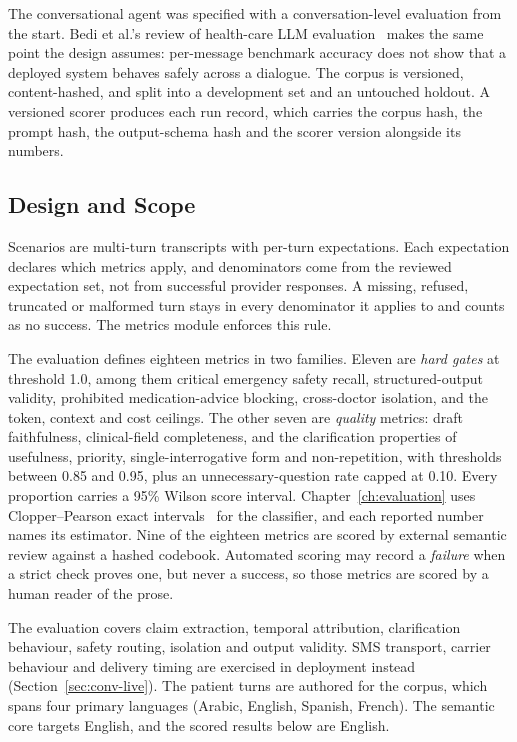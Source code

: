 The conversational agent was specified with a conversation-level evaluation from
the start. Bedi et al.'s review of health-care LLM evaluation~\cite{bedi2025testing}
makes the same point the design assumes: per-message benchmark accuracy does not
show that a deployed system behaves safely across a dialogue. The corpus is
versioned, content-hashed, and split into a development set and an untouched
holdout. A versioned scorer produces each run record, which carries the corpus
hash, the prompt hash, the output-schema hash and the scorer version alongside
its numbers.

\subsection{Design and Scope}

Scenarios are multi-turn transcripts with per-turn expectations. Each
expectation declares which metrics apply, and denominators come from the
reviewed expectation set, not from successful provider responses. A missing,
refused, truncated or malformed turn stays in every denominator it applies to
and counts as no success. The metrics module enforces this rule.

The evaluation defines eighteen metrics in two families. Eleven are \emph{hard
gates} at threshold 1.0, among them critical emergency safety recall,
structured-output validity, prohibited medication-advice blocking, cross-doctor
isolation, and the token, context and cost ceilings. The other seven are
\emph{quality} metrics: draft faithfulness, clinical-field completeness, and the
clarification properties of usefulness, priority, single-interrogative form and
non-repetition, with thresholds between 0.85 and 0.95, plus an
unnecessary-question rate capped at 0.10. Every proportion carries a 95\% Wilson
score interval. Chapter~\ref{ch:evaluation} uses Clopper--Pearson exact
intervals~\cite{clopper1934confidence} for the classifier, and each reported
number names its estimator. Nine of the eighteen metrics are scored by
external semantic review against a hashed codebook. Automated scoring may record
a \emph{failure} when a strict check proves one, but never a success, so those
metrics are scored by a human reader of the prose.

The evaluation covers claim extraction, temporal attribution, clarification
behaviour, safety routing, isolation and output validity. SMS transport, carrier
behaviour and delivery timing are exercised in deployment instead
(Section~\ref{sec:conv-live}). The patient turns are authored for the corpus,
which spans four primary languages (Arabic, English, Spanish, French). The
semantic core targets English, and the scored results below are English.

